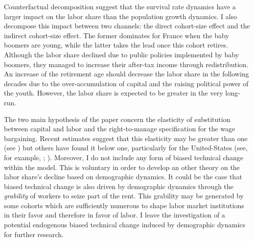 Counterfactual decomposition suggest that the survival rate dynamics have a larger impact on the labor share than the population growth dynamics. I also decompose this impact between two channels: the direct cohort-size effect and the indirect cohort-size effect. The former dominates for France when the baby boomers are young, while the latter takes the lead once this cohort retires. Although the labor share declined due to public policies implemented by baby boomers, they managed to increase their after-tax income through redistribution. An increase of the retirement age should decrease the labor share in the following decades due to the over-accumulation of capital and the raising political power of the youth. However, the labor share is expected to be greater in the very long-run.

The two main hypothesis of the paper concern the elasticity of substitution between capital and labor and the right-to-manage specification for the wage bargaining. Recent estimates suggest that this elasticity may be greater than one (see \citealt{Karabarbounis2014}) but others have found it below one, particularly for the United-States (see, for example, \citealt{Antras2004}; \citealt{Chirinko2008}). Moreover, I do not include any form of biased technical change within the model. This is voluntary in order to develop an other theory on the labor share's decline based on demographic dynamics. It could be the case that biased technical change is also driven by demographic dynamics through the \textit{grability} of workers to seize part of the rent. This grability may be generated by some cohorts which are sufficiently numerous to shape labor market institutions in their favor and therefore in favor of labor. I leave the investigation of a potential endogenous biased technical change induced by demographic dynamics for further research.